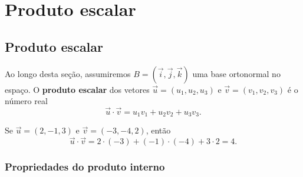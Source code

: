 
\chapter{Produto escalar}\label{cap_prodesc}
\thispagestyle{fancy}

\section{Produto escalar}\label{cap_prodesc_sec_prodesc}

Ao longo desta seção, assumiremos $B = (\vec{i},\vec{j},\vec{k})$ uma base ortonormal no espaço. O {\bf produto escalar} dos vetores $\vec{u} = (u_1,u_2,u_3)$ e $\vec{v}=(v_1,v_2,v_3)$ é o número real
\begin{equation}
  \vec{u}\cdot\vec{v} = u_1v_1+u_2v_2+u_3v_3.
\end{equation}

\begin{ex}
  Se $\vec{u}=(2,-1,3)$ e $\vec{v}=(-3,-4,2)$, então
  \begin{equation}
    \vec{u}\cdot\vec{v} = 2\cdot(-3)+(-1)\cdot(-4)+3\cdot 2 = 4.
  \end{equation}
\end{ex}

\subsection{Propriedades do produto interno}

